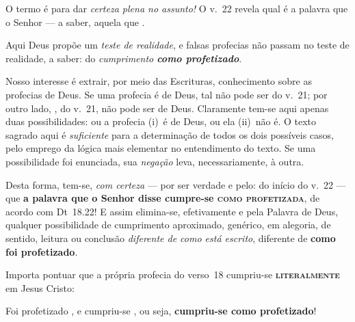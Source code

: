 
    O termo  é para dar \emph{certeza plena no assunto!} O v.~22 revela qual é a palavra que o Senhor  --- a saber, aquela que .

    Aqui Deus propõe um \emph{teste de  realidade},  e  falsas  profecias  não  passam  no  teste  de  realidade,  a  saber:  do
    \emph{cumprimento \textbf{como profetizado}}.

    Nosso interesse é extrair, por meio das Escrituras, conhecimento sobre as profecias de Deus. Se uma profecia é de Deus,  tal
    não pode ser  do v.~21; por outro lado, ,
    do v.~21, não pode ser de Deus. Claramente tem-se aqui apenas duas possibilidades: ou a  profecia  (i)~é  de  Deus,  ou  ela
    (ii)~não é. O texto sagrado aqui é \emph{suficiente} para a determinação de todos os dois possíveis casos, pelo  emprego  da
    lógica  mais  elementar  no  entendimento  do  texto.  Se  uma  possibilidade  foi  enunciada,  sua   \emph{negação}   leva,
    necessariamente, à outra.

    Desta forma, tem-se, \emph{com certeza} --- por ser verdade e pelo:  do início do v.~22 ---  que  \textbf{a
    palavra que o Senhor disse cumpre-se \textsc{como profetizada}}, de acordo com Dt~18.22! E assim elimina-se, efetivamente  e
    pela Palavra de Deus, qualquer possibilidade de cumprimento aproximado,  genérico,  em  alegoria,  de  sentido,  leitura  ou
    conclusão \emph{diferente de como está escrito}, diferente de \textbf{como foi profetizado}.

    Importa pontuar que a própria profecia do verso~18 cumpriu-se \textbf{\textsc{literalmente}} em Jesus Cristo:
 

    Foi profetizado , e cum\-priu-se , ou seja, \textbf{cumpriu-se como profetizado}!

